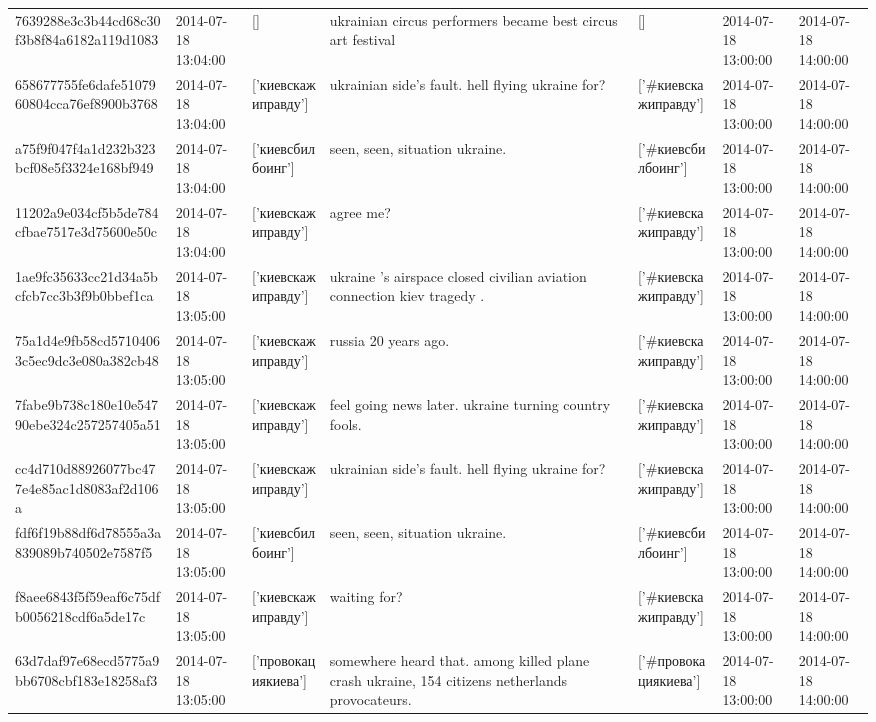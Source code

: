\begin{tabular}{lllllll}
7639288e3c3b44cd68c30f3b8f84a6182a119d1083 & 2014-07-18 13:04:00 & [] & ukrainian circus performers became best circus art festival & [] & 2014-07-18 13:00:00 & 2014-07-18 14:00:00 \\
658677755fe6dafe5107960804cca76ef8900b3768 & 2014-07-18 13:04:00 & ['киевскажиправду'] & ukrainian side's fault. hell flying ukraine for? & ['#киевскажиправду'] & 2014-07-18 13:00:00 & 2014-07-18 14:00:00 \\
a75f9f047f4a1d232b323bcf08e5f3324e168bf949 & 2014-07-18 13:04:00 & ['киевсбилбоинг'] & seen, seen, situation ukraine. & ['#киевсбилбоинг'] & 2014-07-18 13:00:00 & 2014-07-18 14:00:00 \\
11202a9e034cf5b5de784cfbae7517e3d75600e50c & 2014-07-18 13:04:00 & ['киевскажиправду'] & agree me? & ['#киевскажиправду'] & 2014-07-18 13:00:00 & 2014-07-18 14:00:00 \\
1ae9fc35633cc21d34a5bcfcb7cc3b3f9b0bbef1ca & 2014-07-18 13:05:00 & ['киевскажиправду'] & ukraine 's airspace closed civilian aviation connection kiev tragedy . & ['#киевскажиправду'] & 2014-07-18 13:00:00 & 2014-07-18 14:00:00 \\
75a1d4e9fb58cd57104063c5ec9dc3e080a382cb48 & 2014-07-18 13:05:00 & ['киевскажиправду'] & russia 20 years ago. & ['#киевскажиправду'] & 2014-07-18 13:00:00 & 2014-07-18 14:00:00 \\
7fabe9b738c180e10e54790ebe324c257257405a51 & 2014-07-18 13:05:00 & ['киевскажиправду'] & feel going news later. ukraine turning country fools. & ['#киевскажиправду'] & 2014-07-18 13:00:00 & 2014-07-18 14:00:00 \\
cc4d710d88926077bc477e4e85ac1d8083af2d106a & 2014-07-18 13:05:00 & ['киевскажиправду'] & ukrainian side's fault. hell flying ukraine for? & ['#киевскажиправду'] & 2014-07-18 13:00:00 & 2014-07-18 14:00:00 \\
fdf6f19b88df6d78555a3a839089b740502e7587f5 & 2014-07-18 13:05:00 & ['киевсбилбоинг'] & seen, seen, situation ukraine. & ['#киевсбилбоинг'] & 2014-07-18 13:00:00 & 2014-07-18 14:00:00 \\
f8aee6843f5f59eaf6c75dfb0056218cdf6a5de17c & 2014-07-18 13:05:00 & ['киевскажиправду'] & waiting for? & ['#киевскажиправду'] & 2014-07-18 13:00:00 & 2014-07-18 14:00:00 \\
63d7daf97e68ecd5775a9bb6708cbf183e18258af3 & 2014-07-18 13:05:00 & ['провокациякиева'] & somewhere heard that. among killed plane crash ukraine, 154 citizens netherlands provocateurs. & ['#провокациякиева'] & 2014-07-18 13:00:00 & 2014-07-18 14:00:00 \\

\end{tabular}
